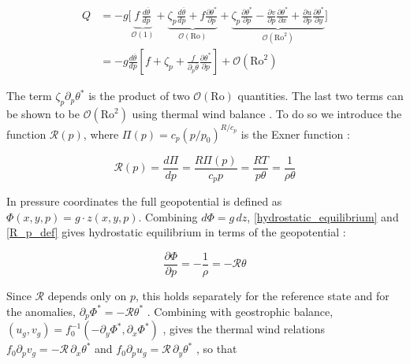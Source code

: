 \documentclass{article}
\begin{document}
\begin{equation}
\begin{aligned}
    Q &= -g\Bigg[\underbrace{f\,\frac{d \overline{\theta}}{d p}}_{\mathcal{O}(1)}
+\underbrace{\zeta_p\frac{d \overline{\theta}}{d p}+f\frac{\partial\theta^*}{\partial p}}_{\mathcal{O}(\mathrm{Ro})}
+\underbrace{\zeta_p\frac{\partial\theta^*}{\partial p}
-\frac{\partial v}{\partial p}\frac{\partial\theta^*}{\partial x}
+\frac{\partial u}{\partial p}\frac{\partial\theta^*}{\partial y}}_{\mathcal{O}(\mathrm{Ro}^2)}\Bigg] \\
&= -g \frac{d\overline{\theta}}{d p} \left[f + \zeta_p + \frac{f}{\partial_p \overline{\theta}} \frac{\partial \theta^*}{\partial p} \right] + \mathcal{O}\left(\mathrm{Ro}^2\right)
\end{aligned}
\end{equation}

The term $\zeta_p \partial_p \theta^*$ is the product of two $\mathcal{O}(\mathrm{Ro})$ quantities.
The last two terms can be shown to be $\mathcal{O}\left(\mathrm{Ro}^2\right)$ using thermal wind balance \cite{Vallis2017}.
To do so we introduce the function $\mathcal{R}(p)$, where $\Pi(p) = c_p \left(p/p_0\right)^{R/c_p}$ is the Exner function \cite{Hoskins1985}:

\begin{equation}\label{R_p_def}
    \mathcal{R}(p) = \frac{d\Pi}{dp} = \frac{R \Pi(p)}{c_pp} = \frac{RT}{p \theta} = \frac{1}{\rho \theta}
\end{equation}

In pressure coordinates the full geopotential is defined as $\Phi (x,y,p) = g \cdot z(x,y,p)$.
Combining $d \Phi = g \,dz$, \cref{hydrostatic_equilibrium} and \cref{R_p_def} gives hydrostatic equilibrium in terms of the geopotential \cite{HOLTON_chapter6,Hoskins1985}:

\begin{equation}\label{hydrostatic_geopotential}
    \frac{\partial \Phi}{\partial p} = - \frac{1}{\rho} = - \mathcal{R}\theta
\end{equation}

Since $\mathcal{R}$ depends only on $p$, this holds separately for the reference state and for the anomalies, $\partial_p \Phi^* = -\mathcal{R}\theta^*$ \cite{Hoskins1985}.
Combining with geostrophic balance, $(u_g, v_g) = f_0^{-1}\left(-\partial_y \Phi^*, \partial_x \Phi^*\right)$ \cite{HOLTON_chapter6}, gives the thermal wind relations $f_0 \partial_p v_g = -\mathcal{R}\, \partial_x \theta^*$ and $f_0 \partial_p u_g = \mathcal{R}\, \partial_y \theta^*$ \cite{HOLTON_chapter6}, so that
\end{document}
